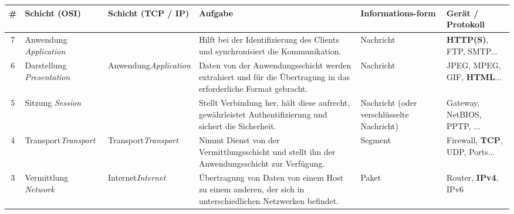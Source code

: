 \begin{table}[H]
	\centering

	\begin{tabular}{c|m{2.6cm}||m{2cm}||m{4.6cm}|m{2.5cm}|m{2cm}}
		\textbf{\#}              & \textbf{Schicht (OSI)}                     & \textbf{Schicht \newline (TCP / IP)}    & \textbf{Aufgabe}                                                                                                & \textbf{Informations-\newline form}       & \textbf{Gerät / \newline Protokoll}   \\ \midrule\midrule
		\rowcolor{yellow!10}7    & Anwendung \newline \textit{Application}    &                                         & Hilft bei der Identifizierung des Clients und synchronisiert die Kommunikation.                                 & Nachricht                                 & \textbf{HTTP(S)}, FTP, SMTP...        \\
		\rowcolor{yellow!20}6    & Darstellung \newline \textit{Presentation} & Anwendung\newline\textit{Application}   & Daten von der Anwendungsschicht werden extrahiert und für die Übertragung in das erforderliche Format gebracht. & Nachricht                                 & JPEG, MPEG, GIF, \textbf{HTML}...     \\
		\rowcolor{yellow!30}5    & Sitzung \newline \textit{Session}          &                                         & Stellt Verbindung her, hält diese aufrecht, gewährleistet Authentifizierung und sichert die Sicherheit.         & Nachricht (oder verschlüsselte Nachricht) & Gateway, NetBIOS, PPTP, ...           \\
		\rowcolor{orange!20}4    & Transport\newline \textit{Transport}       & Transport\newline\textit{Transport}     & Nimmt Dienst von der Vermittlungsschicht und stellt ihn der Anwendungsschicht zur Verfügung.                    & Segment                                   & Firewall, \textbf{TCP}, UDP, Ports... \\
		\rowcolor{RoyalBlue!20}3 & Vermittlung \newline \textit{Network}      & Internet\newline\textit{Internet}       & Übertragung von Daten von einem Host zu einem anderen, der sich in unterschiedlichen Netzwerken befindet.       & Paket                                     & Router, \textbf{IPv4}, IPv6           \\

\end{tabular}
\end{table}
